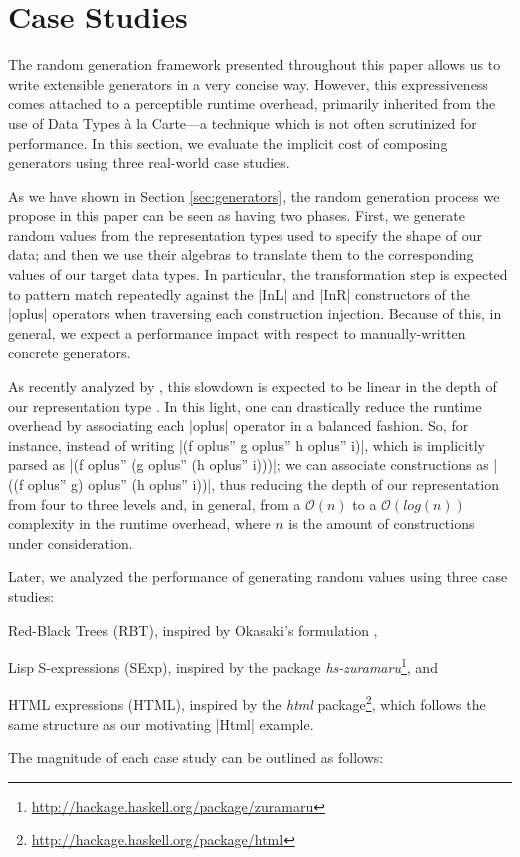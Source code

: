 \section{Case Studies}
\label{sec:casestudies}

The random generation framework presented throughout this paper allows us to
write extensible generators in a very concise way.
%
However, this expressiveness comes attached to a perceptible runtime overhead,
primarily inherited from the use of Data Types \`a la Carte---a technique which
is not often scrutinized for performance.
%
In this section, we evaluate the implicit cost of composing generators using
three real-world case studies.


As we have shown in Section \ref{sec:generators}, the random generation
process we propose in this paper can be seen as having two phases.
%
First, we generate random values from the representation types used to specify
the shape of our data; and then we use their algebras to translate them to the
corresponding values of our target data types.
%
In particular, the transformation step is expected to pattern match repeatedly
against the |InL| and |InR| constructors of the |oplus| operators when
traversing each construction injection.
%
Because of this, in general, we expect a performance impact with respect to
manually-written concrete generators.


As recently analyzed by \citeauthor{KiriyamaOptimizingDTC}, this slowdown is
expected to be linear in the depth of our representation type
\cite{KiriyamaOptimizingDTC}.
%
In this light, one can drastically reduce the runtime overhead by associating
each |oplus| operator in a balanced fashion.
%
So, for instance, instead of writing |(f oplus'' g oplus'' h oplus'' i)|, which
is implicitly parsed as |(f oplus'' (g oplus'' (h oplus'' i)))|; we can
associate constructions as |((f oplus'' g) oplus'' (h oplus'' i))|, thus
reducing the depth of our representation from four to three levels and, in
general, from a $\mathcal{O}(n)$ to a $\mathcal{O}(log(n))$ complexity in the
runtime overhead, where $n$ is the amount of constructions under consideration.


Later, we analyzed the performance of generating random values using three case
studies:
%
\begin{inparaenum}[(i)]
\item Red-Black Trees (RBT), inspired by Okasaki's formulation
  \cite{okasaki1999red},
\item Lisp S-expressions (SExp), inspired by the package
  \emph{hs-zuramaru}\footnote{\url{http://hackage.haskell.org/package/zuramaru}},
  and
\item HTML expressions (HTML), inspired by the \emph{html}
  package\footnote{\url{http://hackage.haskell.org/package/html}}, which follows
  the same structure as our motivating |Html| example.
\end{inparaenum}
%
The magnitude of each case study can be outlined as follows:

